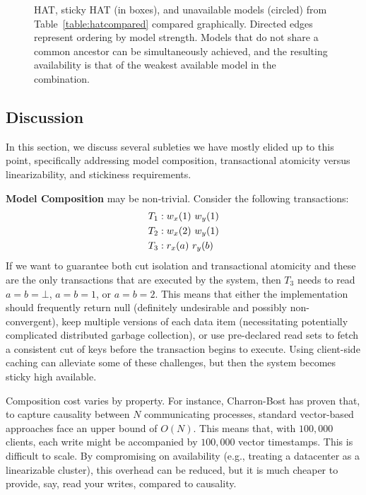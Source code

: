 \begin{figure}
\label{fig:hat-order}
\caption{HAT, sticky HAT (in boxes), and unavailable models (circled)
  from Table~\protect\ref{table:hatcompared} compared
  graphically. Directed edges represent ordering by model
  strength. Models that do not share a common ancestor can be
  simultaneously achieved, and the resulting availability is that of
  the weakest available model in the combination.}
\label{fig:hatcompared}
\end{figure}


\subsection{Discussion}
\label{sec:discussion}

In this section, we discuss several subleties we have mostly elided up
to this point, specifically addressing model composition,
transactional atomicity versus linearizability, and stickiness
requirements.

\noindent\textbf{Model Composition} may be non-trivial. Consider the following transactions:
\begin{align*}
\small
T_1 &: w_x(1)~w_y(1)
\\T_2 &: w_x(2)~w_y(1)
\\T_3 &: r_x(a)~r_y(b)
\end{align*}
If we want to guarantee both cut isolation and transactional atomicity
and these are the only transactions that are executed by the system,
then $T_3$ needs to read $a=b=\bot$, $a=b=1$, or $a=b=2$. This means
that either the implementation should frequently return null
(definitely undesirable and possibly non-convergent), keep multiple
versions of each data item (necessitating potentially complicated
distributed garbage collection), or use pre-declared read sets to
fetch a consistent cut of keys before the transaction begins to
execute. Using client-side caching can alleviate some of these
challenges, but then the system becomes sticky high available.

Composition cost varies by property. For instance, Charron-Bost has
proven that, to capture causality between $N$ communicating processes,
standard vector-based approaches face an upper bound of $O(N)$. This
means that, with $100,000$ clients, each write might be accompanied by
$100,000$ vector timestamps. This is difficult to scale. By
compromising on availability (e.g., treating a datacenter as a
linearizable cluster), this overhead can be reduced, but it is much
cheaper to provide, say, read your writes, compared to causality.

